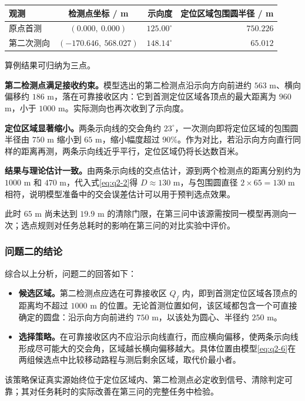 \Needspace{38mm}
\begin{center}
\begin{minipage}{\linewidth}
\centering\small
{}
\label{tab:q2-example}
\vspace{4pt}
\begin{tabular}{@{}lcrr@{}}
\toprule
观测 & 检测点坐标 / m & 示向度 & 定位区域包围圆半径 / m \\
\midrule
原点首测 & $(0.000,\ 0.000)$ & $125.00^\circ$ & $750.226$ \\
第二次测向 & $(-170.646,\ 568.027)$ & $148.14^\circ$ & $65.012$ \\
\bottomrule
\end{tabular}
\end{minipage}
\end{center}

算例结果可归纳为三点。

\textbf{第二检测点满足接收约束。}模型选出的第二检测点沿示向方向前进约 $563$ m、横向偏移约 $186$ m，落在可靠接收区内：它到首测定位区域各顶点的最大距离为 $960$ m，小于 $1000$ m。实际测向也再次收到了示向度。

\textbf{定位区域显著缩小。}两条示向线的交会角约 $23^\circ$，一次测向即将定位区域的包围圆半径由 $750$ m 缩小到 $65$ m，缩小幅度超过 $90\%$。作为对比，若沿示向方向直行同样的距离再测，两条示向线近乎平行，定位区域仍将长达数百米。

\textbf{结果与理论估计一致。}由两条示向线的交点估计，源到两个检测点的距离分别约为 $1000$ m 和 $470$ m，代入式\eqref{eq:q2-2}得 $D\approx130$ m，与包围圆直径 $2\times65=130$ m 相符，说明模型准备中的交会误差估计可以用于预判选点效果。

此时 $65$ m 尚未达到 $19.9$ m 的清除门限，在第三问中该源需按同一模型再测向一次；选点规则对任务总耗时的影响在第三问的对比实验中评价。

\subsubsection{问题二的结论}\label{sec:q2-5}

综合以上分析，问题二的回答如下：

\begin{itemize}
\item \textbf{候选区域。}第二检测点应选在可靠接收区 $Q_f$ 内，即到首测定位区域各顶点的距离均不超过 $1000$ m 的位置。无论首测位置如何，该区域都包含一个可直接确定的圆盘：沿示向方向前进约 $750$ m，以该处为圆心、半径约 $250$ m。
\item \textbf{选择策略。}在可靠接收区内不应沿示向线直行，而应横向偏移，使两条示向线形成尽可能大的交会角，区域越长横向偏移越大。具体位置由模型\eqref{eq:q2-6}在两组候选点中比较移动路程与测后剩余区域，取代价最小者。
\end{itemize}

该策略保证真实源始终位于定位区域内、第二检测点必定收到信号、清除判定可靠；其对任务耗时的实际改善在第三问的完整任务中检验。
